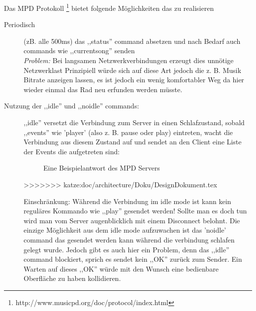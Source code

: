 Das MPD Protokoll \footnote{http://www.musicpd.org/doc/protocol/index.html} bietet folgende Möglichkeiten das zu realisieren
\begin{description}
    \item [Periodisch] (zB. alle 500ms) das ,,status'' command absetzen und nach Bedarf auch commands wie ,,currentsong''
        senden
        \\
        \emph{Problem:} Bei langsamen Netzwerkverbindungen erzeugt dies unnötige Netzwerklast 
        Prinzipiell würde sich auf diese Art jedoch die z. B. Musik Bitrate anzeigen lassen, es ist jedoch ein
        wenig komfortabler Weg da hier wieder einmal das Rad neu erfunden werden müsste.
    \item [Nutzung der ,,idle'' und ,,noidle'' commands:]
        ,,idle'' versetzt die Verbindung zum Server in einen Schlafzustand, sobald ,,events'' wie 'player' (also z. B. pause oder play) 
        eintreten, wacht die Verbindung aus diesem Zustand auf und sendet an den Client eine Liste der Events die aufgetreten sind:

\begin{figure}[h!]
    
\caption{Eine Beispielantwort des MPD Servers}
\label{dd_state}
\end{figure}
>>>>>>> katze:doc/architecture/Doku/DesignDokument.tex

        Einschränkung: Während die Verbindung im idle mode ist kann kein reguläres Kommando wie ,,play'' gesendet werden!
        Sollte man es doch tun wird man vom Server augenblicklich mit einem Disconnect belohnt.
        Die einzige Möglichkeit aus dem idle mode aufzuwachen ist das 'noidle' command das gesendet werden
        kann während die verbindung schlafen gelegt wurde.
        Jedoch gibt es auch hier ein Problem, denn das ,,idle'' command blockiert, sprich es sendet kein ,,OK'' zurück zum Sender.
        Ein Warten auf dieses ,,OK'' würde mit den Wunsch eine bedienbare Oberfläche zu haben kollidieren.
\end{description}

